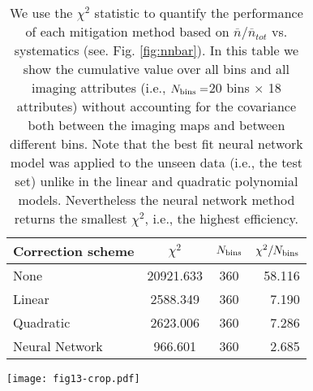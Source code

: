 \documentclass[fleqn, usenatbib]{mnras}
\begin{document}
\begin{table}
	\centering
	\caption{We use the $\chi^{2}$ statistic to quantify the performance of each mitigation method based on $\overline{n}/\overline{n}_{tot}$ vs. systematics (see. Fig. \ref{fig:nnbar}). In this table we show the cumulative value over all bins and all imaging attributes (i.e., $N_{\rm bins}=$20 bins $\times$ 18 attributes) without accounting for the covariance both between the imaging maps and between different bins. Note that the best fit neural network model was applied to the unseen data (i.e., the test set) unlike in the linear and quadratic polynomial models. Nevertheless the neural network method returns the smallest $\chi^{2}$, i.e., the highest efficiency.}
	\label{tab:chi2}
	\begin{tabular}{lccr} %
	    \hline
		\hline
		Correction scheme & $\chi^{2}$ & $N_{\rm bins}$ & $\chi^{2}/N_{\rm bins}$ \\
		\hline
		None & 20921.633 & 360 & 58.116\\
		Linear & 2588.349 & 360 & 7.190\\
		Quadratic & 2623.006 & 360 & 7.286 \\
		Neural Network & 966.601 & 360 & 2.685\\
		\hline
		\hline
	\end{tabular}
\end{table}


\begin{figure*}
\centering
\texttt{[image: fig13-crop.pdf]}
\caption{The number density of galaxies as a function of the potential systematics. The solid black curve shows the result before mitigation (\textit{no correction}); the solid red curve is for the result after correcting with the neural network selection mask; the dot-dashed and dashed black curves represent mitigations with the linear and quadratic polynomial selection masks, respectively. The error bars are estimated using the Jackknife resampling of 20 non-contiguous subsamples of pixels within each imaging attribute bin (a total of 20 bins per attribute) and are shown only for one case. This plot again shows that the Galactic foregrounds such as the stellar density introduce a systematic trend in the galaxy density, which indicates a significant contamination by our own galaxy before mitigation. Such systematic trends are mostly removed with any of the three mitigation methods. \label{fig:nnbar}}
\end{figure*}
\end{document}
